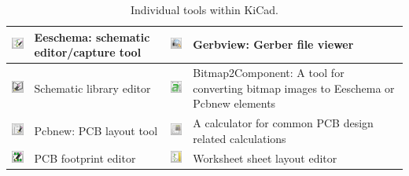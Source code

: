\documentclass[12pt,letterpaper]{scrartcl}
\begin{document}
\begin{table}[h]
\caption{Individual tools within KiCad.}
\begin{tabular}{|m{0.5in}|m{2in}||m{0.5in}|m{2in}|}
\hline \includegraphics[width=0.5in]{eeschema-icon}  &   Eeschema: schematic editor/capture tool & \includegraphics[width=0.5in]{gerbview-icon} &  Gerbview: Gerber file viewer\\ 

\hline \includegraphics[width=0.5in]{sche-lib-icon} &  Schematic library editor & \includegraphics[width=0.5in]{bitmap2component-icon} &  Bitmap2Component: A tool for converting bitmap images to Eeschema or Pcbnew elements\\ 

\hline \includegraphics[width=0.5in]{pcbnew-icon} &  Pcbnew: PCB layout tool & \includegraphics[width=0.5in]{calculator-icon} &  A calculator for common PCB design related calculations\\ 

\hline \includegraphics[width=0.5in]{footprint-lib-icon} &  PCB footprint editor & \includegraphics[width=0.5in]{pi-editor-icon} &  Worksheet sheet layout editor\\ 
\hline 
\end{tabular}
\label{tab:kicad-icons} 
\end{table}
\end{document}
